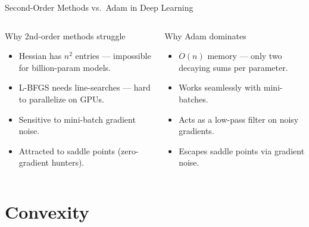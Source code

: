 \begin{frame}{Second-Order Methods vs.\ Adam in Deep Learning}
  \begin{columns}[t]
      \begin{alertblock}{Why 2nd-order methods struggle}
        \begin{itemize}
          \item Hessian has $n^2$ entries — impossible for billion-param models.
          \item L-BFGS needs line-searches — hard to parallelize on GPUs.
          \item Sensitive to mini-batch gradient noise.
          \item Attracted to saddle points (zero-gradient hunters).
        \end{itemize}
      \end{alertblock}
      \begin{block}{Why Adam dominates}
        \begin{itemize}
          \item $O(n)$ memory — only two decaying sums per parameter.
          \item Works seamlessly with mini-batches.
          \item Acts as a low-pass filter on noisy gradients.
          \item Escapes saddle points via gradient noise.
        \end{itemize}
      \end{block}
  \end{columns}
\end{frame}

\section{Convexity}

